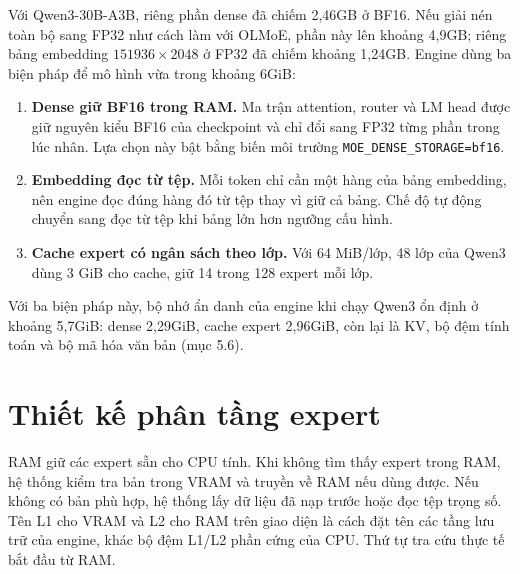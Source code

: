 Với Qwen3-30B-A3B, riêng phần dense đã chiếm 2,46GB ở BF16. Nếu giải nén toàn bộ sang FP32 như cách làm với OLMoE, phần này lên khoảng 4,9GB; riêng bảng embedding $151936\times2048$ ở FP32 đã chiếm khoảng 1,24GB. Engine dùng ba biện pháp để mô hình vừa trong khoảng 6GiB:

\begin{enumerate}
\item \textbf{Dense giữ BF16 trong RAM.} Ma trận attention, router và LM head được giữ nguyên kiểu BF16 của checkpoint và chỉ đổi sang FP32 từng phần trong lúc nhân. Lựa chọn này bật bằng biến môi trường \texttt{MOE\_DENSE\_STORAGE=bf16}.
\item \textbf{Embedding đọc từ tệp.} Mỗi token chỉ cần một hàng của bảng embedding, nên engine đọc đúng hàng đó từ tệp thay vì giữ cả bảng. Chế độ tự động chuyển sang đọc từ tệp khi bảng lớn hơn ngưỡng cấu hình.
\item \textbf{Cache expert có ngân sách theo lớp.} Với 64 MiB/lớp, 48 lớp của Qwen3 dùng 3 GiB cho cache, giữ 14 trong 128 expert mỗi lớp.
\end{enumerate}

Với ba biện pháp này, bộ nhớ ẩn danh của engine khi chạy Qwen3 ổn định ở khoảng 5,7GiB: dense 2,29GiB, cache expert 2,96GiB, còn lại là KV, bộ đệm tính toán và bộ mã hóa văn bản (mục 5.6).

\section{Thiết kế phân tầng expert}

RAM giữ các expert sẵn cho CPU tính. Khi không tìm thấy expert trong RAM, hệ thống kiểm tra bản trong VRAM và truyền về RAM nếu dùng được. Nếu không có bản phù hợp, hệ thống lấy dữ liệu đã nạp trước hoặc đọc tệp trọng số. Tên L1 cho VRAM và L2 cho RAM trên giao diện là cách đặt tên các tầng lưu trữ của engine, khác bộ đệm L1/L2 phần cứng của CPU. Thứ tự tra cứu thực tế bắt đầu từ RAM.


